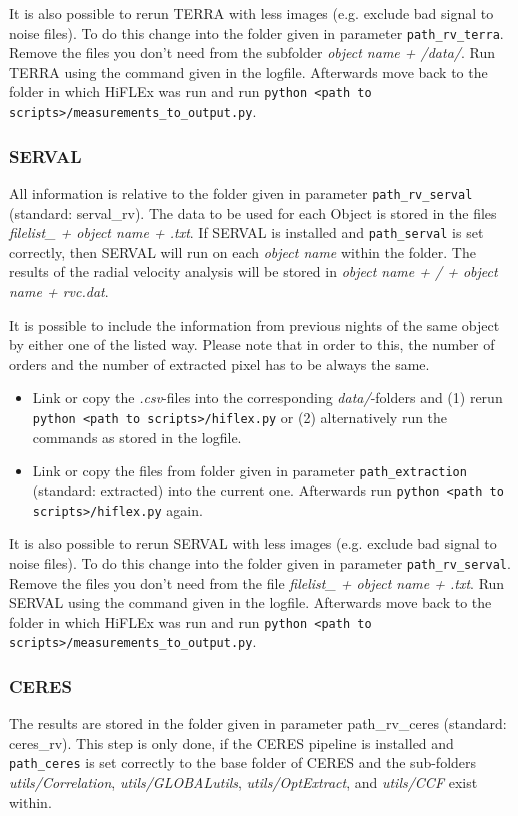 \documentclass[10pt,a4paper]{article}
\begin{document}
It is also possible to rerun TERRA with less images (e.g. exclude bad signal to noise files). To do this change into the folder given in parameter \verb|path_rv_terra|. Remove the files you don't need from the subfolder \textit{object name + /data/}. Run TERRA using the command given in the logfile. Afterwards move back to the folder in which HiFLEx was run and run \verb|python <path to scripts>/measurements_to_output.py|.

\subsubsection{SERVAL}
\label{Section:files_folders_rv_for_serval}
All information is relative to the folder given in parameter \verb|path_rv_serval| (standard: serval\_rv). 
The data to be used for each Object is stored in the files \textit{filelist\_ + object name + .txt}. If SERVAL is installed and \verb|path_serval| is set correctly, then SERVAL will run on each \textit{object name} within the folder. The results of the radial velocity analysis will be stored in \textit{object name + / + object name + rvc.dat}.

It is possible to include the information from previous nights of the same object by either one of the listed way. Please note that in order to this, the number of orders and the number of extracted pixel has to be always the same.
\begin{itemize}
  \item Link or copy the \textit{.csv}-files into the corresponding \textit{data/}-folders and (1) rerun \verb|python <path to scripts>/hiflex.py| or (2) alternatively run the commands as stored in the logfile.
  \item Link or copy the files from folder given in parameter \verb|path_extraction| (standard: extracted) into the current one. Afterwards run \verb|python <path to scripts>/hiflex.py| again.
\end{itemize}

It is also possible to rerun SERVAL with less images (e.g. exclude bad signal to noise files). To do this change into the folder given in parameter \verb|path_rv_serval|. Remove the files you don't need from the file \textit{filelist\_ + object name + .txt}. Run SERVAL using the command given in the logfile. Afterwards move back to the folder in which HiFLEx was run and run \verb|python <path to scripts>/measurements_to_output.py|.

\subsubsection{CERES}
The results are stored in the folder given in parameter path\_rv\_ceres (standard: ceres\_rv).
This step is only done, if the CERES pipeline is installed and \verb|path_ceres| is set correctly to the base folder of CERES and the sub-folders \textit{utils/Correlation}, \textit{utils/GLOBALutils}, \textit{utils/OptExtract}, and \textit{utils/CCF} exist within.
\end{document}

